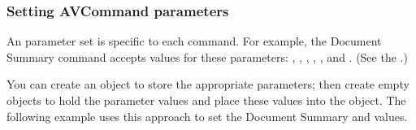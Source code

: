 \documentclass[letterpaper,12pt,english,openany,oneside]{sphinxmanual}
\begin{document}
\begin{sphinxVerbatim}[commandchars=\\\{\}]
        
   
   

      

  
 
\end{sphinxVerbatim}


\subsubsection{Setting AVCommand parameters}
\label{\detokenize{Plugins_Handlers:setting-avcommand-parameters}}
An  parameter set is specific to each command. For example, the Document Summary command accepts values for these parameters: , , , , , and . (See the .)

You can create an  object to store the appropriate parameters; then create empty  objects to hold the parameter values and place these values into the  object. The following example uses this approach to set the Document Summary  and  values.
\end{document}
